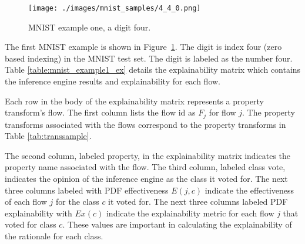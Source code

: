 \begin{figure}[H]
    \centerline{\texttt{[image: ./images/mnist\_samples/4\_4\_0.png]}}
    \caption{MNIST example one, a digit four.}
    \label{fig:mnist_example1}
\end{figure}


The first MNIST example is shown in Figure~\ref{fig:mnist_example1}.  The digit is
index four (zero based indexing) in the MNIST test set.  The digit is labeled as
the number four. Table \ref{table:mnist_example1_ex} details the explainability
matrix which contains the inference engine results and explainability for each
flow.

Each row in the body of the explainability matrix represents a property
transform's flow. The first column lists the flow id as $F_j$ for flow $j$.
The property transforms associated with the flows correspond to the property
transforms in Table \ref{tab:transsample}.

The second column, labeled property, in the explainability matrix indicates the
property name associated with the flow.  The third column, labeled class vote,
indicates the opinion of the inference engine as the class it voted for. The
next three columns labeled with PDF effectiveness $E(j,c)$ indicate the
effectiveness of each flow $j$ for the class $c$ it voted for. The next three
columns labeled PDF explainability with $Ex(c)$ indicate the explainability
metric for each flow $j$ that voted for class $c$. These values are important in
calculating the explainability of the rationale for each class.

